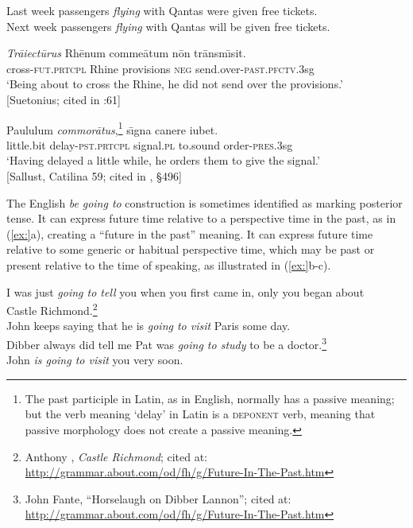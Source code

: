 \ea
\ea Last week passengers \textit{flying} with Qantas were given free tickets.\\
\ex Next week passengers \textit{flying} with Qantas will be given free tickets.
                       \z
\z

\ea
\textit{Tr\=aiect\=urus}  Rh\=enum  comme\=atum  n\=on  tr\=ansm\={\i}sit.\\
cross-\textsc{fut.prtcpl}  Rhine  provisions  \textsc{neg}  send.over-\textsc{past.pfctv.3}sg\\
‘Being about to cross the Rhine, he did not send over the provisions.’\\
{}[Suetonius; cited in \citealt{Comrie1985}:61]
\z

\ea
Paululum  \textit{commor\=atus},\footnote{The past participle in Latin, as in English, normally has a passive meaning; but the verb meaning ‘delay’ in Latin is a \textsc{deponent} verb, meaning that passive morphology does not create a passive meaning.}  s\={\i}gna  canere  iubet.\\
little.bit  delay-\textsc{pst.prtcpl}  signal.\textsc{pl}  to.sound  order-\textsc{pres.3}sg\\
‘Having delayed a little while, he orders them to give the signal.’\\
{}[Sallust, Catilina 59; cited in \citealt{AllenGreenough1931}, §496]
\z


The English \textit{be} \textit{going to} construction is sometimes identified as marking posterior tense. It can express future time relative to a perspective time in the past, as in (\ref{ex:}a), creating a “future in the past” meaning. It can express future time relative to some generic or habitual perspective time, which may be past or present relative to the time of speaking, as illustrated in (\ref{ex:}b-c).


\ea
\ea I was just \textit{going to tell} you when you first came in, only you began about\\
  Castle Richmond.\footnote{Anthony \citet{Trollope1860}, \textit{Castle Richmond}; cited at: \url{http://grammar.about.com/od/fh/g/Future-In-The-Past.htm}} \\
\ex John keeps saying that he is \textit{going to visit} Paris some day.\\
\ex Dibber always did tell me Pat was \textit{going to study} to be a doctor.\footnote{John Fante, “Horselaugh on Dibber Lannon”; cited at: \url{http://grammar.about.com/od/fh/g/Future-In-The-Past.htm}} \\
\ex John \textit{is going to visit} you very soon.
                       \z
\z


